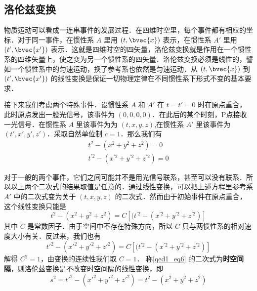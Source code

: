 

\subsection{洛伦兹变换}
物质运动可以看成一连串事件的发展过程．在四维时空里，每个事件都有相应的坐标．对于同一事件，在惯性系 $A$ 里用 $(t, \bvec{x})$ 表示，在惯性系 $A'$ 里用 $(t', \bvec{x'})$ 表示．这就是四维时空的四矢量，洛伦兹变换就是作用在一个惯性系的四维矢量上，使之变为另一个惯性系的四矢量．洛伦兹变换必须是线性的，譬如一个惯性系中的匀速运动，换了参考系也依然是匀速运动．从 $(t, \bvec{x})$ 到 $(t', \bvec{x'})$ 的线性变换是保证一切物理定律在不同惯性系下形式不变的基本要求．

接下来我们考虑两个特殊事件．设惯性系 $A$ 和 $A'$ 在 $t=t'=0$ 时在原点重合，此时原点发出一股光信号，该事件为 $(0,0,0,0)$．在此后的某个时刻，P点接收一光信号．在惯性系 $A$ 里该事件为为 $(t,x,y,z)$,在惯性系 $A'$ 里该事件为 $(t',x',y',z')$．采取自然单位制 $c=1$．那么我们有
\begin{equation}\label{qed1_eq6}
\begin{array}{c}
t^{2}-(x^{2}+y^{2}+z^{2})=0 \\
t^{\prime 2}-(x^{\prime 2}+y^{\prime 2}+z^{\prime 2})=0
\end{array}
\end{equation}

对于一般的两个事件，它们之间可能并不是用光信号联系，甚至可以没有联系．所以以上两个二次式的结果取值是任意的．通过线性变换，可以把上述方程里参考系 $A'$ 中的二次式变为关于 $(t,x,y,z)$ 的二次式．然而由于初始事件在原点重合，这个线性变换只能是
\begin{equation}
t^{2}-(x^{2}+y^{2}+z^{2})=C\left[(t^{\prime 2}-(x^{\prime 2}+y^{\prime 2}+z^{\prime 2})\right]
\end{equation}
其中 $C$ 是常数因子．由于空间中不存在特殊方向，所以 $C$ 只与两惯性系的相对速度大小有关．反过来，我们也有
\begin{equation}
t'^{2}-(x'^{2}+y'^{2}+z'^{2})=C\left[(t^{\prime 2}-(x^{\prime 2}+y^{\prime 2}+z^{\prime 2})\right]
\end{equation}
解得 $C^2=1$，由变换的连续性我们取 $C=1$．
称\autoref{qed1_eq6} 的二次式为\textbf{时空间隔}，则洛伦兹变换是不改变时空间隔的线性变换，即
\begin{equation}
s^2=t'^{2}-(x'^{2}+y'^{2}+z'^{2})=t^{2}-(x^{2}+y^{2}+z^{2})
\end{equation}

